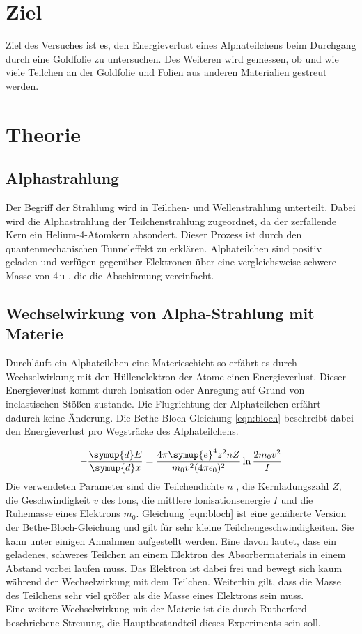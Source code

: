 \section{Ziel}
Ziel des Versuches ist es, den Energieverlust eines Alphateilchens beim
Durchgang durch eine Goldfolie zu untersuchen. Des Weiteren wird gemessen,
ob und wie viele Teilchen an der Goldfolie und Folien aus anderen Materialien
gestreut werden.

\section{Theorie}
\subsection{Alphastrahlung}
Der Begriff der Strahlung wird in Teilchen- und Wellenstrahlung unterteilt. Dabei
wird die Alphastrahlung der Teilchenstrahlung zugeordnet, da der zerfallende
Kern ein Helium-4-Atomkern absondert. Dieser Prozess ist durch den quantenmechanischen
Tunneleffekt zu erklären. Alphateilchen sind positiv geladen und verfügen gegenüber
Elektronen über
eine vergleichsweise schwere Masse
von 4\,u , die die Abschirmung vereinfacht. \cite{potsdam}

\subsection{Wechselwirkung von Alpha-Strahlung mit Materie}
Durchläuft ein Alphateilchen eine Materieschicht so erfährt es durch
Wechselwirkung mit den Hüllenelektron der Atome einen Energieverlust. Dieser
Energieverlust kommt durch Ionisation oder Anregung auf Grund von inelastischen
Stößen zustande. Die Flugrichtung der Alphateilchen erfährt dadurch keine
Änderung. Die Bethe-Bloch Gleichung \eqref{eqn:bloch} beschreibt dabei den
Energieverlust pro Wegsträcke des Alphateilchens.

\begin{equation}
- \frac{\symup{d} E}{\symup{d} x} = \frac{4 \pi \symup{e}^4 z^2 {n} {Z}}
{{m}_0 v^2 (4 \pi \epsilon_0)^2} \ln\frac{2 {m}_0 v^2}{{I}}
\label{eqn:bloch}
\end{equation}
Die verwendeten Parameter sind die Teilchendichte $n$
, die Kernladungszahl $Z$, die Geschwindigkeit $v$ des Ions, die mittlere
Ionisationsenergie $I$ und die Ruhemasse eines Elektrons ${m}_0$.
Gleichung \eqref{eqn:bloch} ist eine genäherte Version der Bethe-Bloch-Gleichung
und gilt für sehr kleine Teilchengeschwindigkeiten. Sie kann unter einigen
Annahmen aufgestellt werden. Eine davon lautet, dass ein geladenes, schweres
Teilchen an einem Elektron des Absorbermaterials in einem Abstand vorbei laufen
muss. Das Elektron ist dabei frei und bewegt sich kaum während der Wechselwirkung
mit dem Teilchen. Weiterhin gilt, dass die Masse des Teilchens sehr viel größer
als die Masse eines Elektrons sein muss.
\\
Eine weitere Wechselwirkung mit der Materie ist die durch Rutherford beschriebene
Streuung, die Hauptbestandteil dieses Experiments sein soll.

